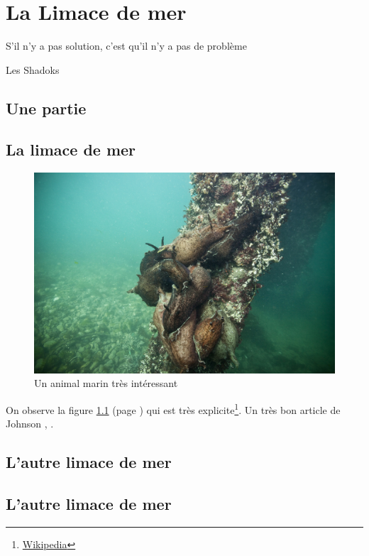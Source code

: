 \chapter{La Limace de mer}
\epigraph{S'il n'y a pas solution, c'est qu'il n'y a pas de problème}{Les Shadoks}

\section{Une partie}
\lipsum[1-2]

\section{La limace de mer}
\begin{figure}[h]
\begin{center}
\includegraphics[width = .5\textwidth]{Chap1/figures/limace}
\end{center}
\caption{Un animal marin très intéressant}
\label{fig:limace}
\end{figure}

On observe la figure \ref{fig:limace} (page \pageref{fig:limace}) qui est très explicite\footnote{\href{https://fr.wikipedia.org/wiki/Aplysia}{Wikipedia}}. Un très bon article de Johnson \cite{Johnson, Zoran}, \citep[chapitre 3]{Johnson}.
\lipsum[1-2]

\section{L'autre limace de mer}
\lipsum[2-4]

\section{L'autre limace de mer}
\lipsum[2-5]